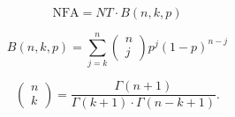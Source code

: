 \documentclass{article}
\begin{document}
\[ \mathrm{NFA} = NT \cdot B(n,k,p) \]
\pagebreak

\[ B(n,k,p) = \sum_{j=k}^n \left(\begin{array}{c}n\\j\end{array}\right) p^{j} (1-p)^{n-j} \]
\pagebreak

\[ \left(\begin{array}{c}n\\k\end{array}\right) = \frac{ \Gamma(n+1) }{ \Gamma(k+1) \cdot \Gamma(n-k+1) }. \]
\pagebreak
\end{document}
